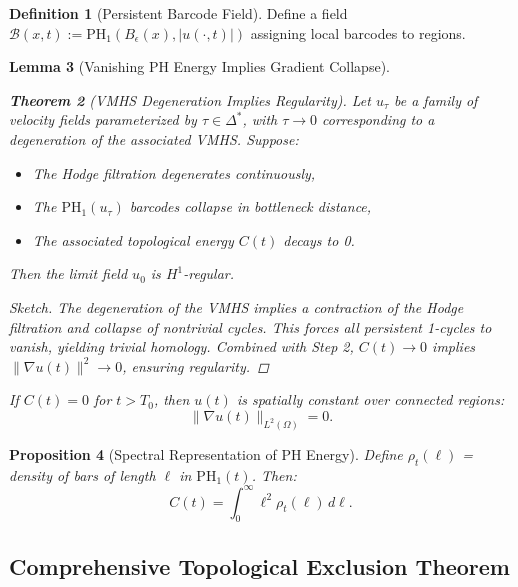 \documentclass[11pt]{article}
\newtheorem{theorem}{Theorem}[section]
\newtheorem{lemma}[theorem]{Lemma}
\newtheorem{proposition}[theorem]{Proposition}
\theoremstyle{definition}
\newtheorem{definition}[theorem]{Definition}
\begin{document}
\begin{definition}[Persistent Barcode Field]
Define a field $\mathcal{B}(x,t) := \mathrm{PH}_1(B_\epsilon(x), |u(\cdot,t)|)$ assigning local barcodes to regions.
\end{definition}

\begin{lemma}[Vanishing PH Energy Implies Gradient Collapse]

\begin{theorem}[VMHS Degeneration Implies Regularity]
Let $u_\tau$ be a family of velocity fields parameterized by $\tau \in \Delta^*$, with $\tau \to 0$ corresponding to a degeneration of the associated VMHS. Suppose:
\begin{itemize}
    \item The Hodge filtration degenerates continuously,
    \item The $\mathrm{PH}_1(u_\tau)$ barcodes collapse in bottleneck distance,
    \item The associated topological energy $C(t)$ decays to 0.
\end{itemize}
Then the limit field $u_0$ is $H^1$-regular.
\end{theorem}

\begin{proof}[Sketch]
The degeneration of the VMHS implies a contraction of the Hodge filtration and collapse of nontrivial cycles. This forces all persistent 1-cycles to vanish, yielding trivial homology. Combined with Step 2, $C(t) \to 0$ implies $\|\nabla u(t)\|^2 \to 0$, ensuring regularity.
\end{proof}
        If $C(t) = 0$ for $t > T_0$, then $u(t)$ is spatially constant over connected regions:
\[
\|\nabla u(t)\|_{L^2(\Omega)} = 0.
\]
\end{lemma}

\begin{proposition}[Spectral Representation of PH Energy]
Define $\rho_t(\ell)$ = density of bars of length $\ell$ in $\mathrm{PH}_1(t)$. Then:
\[
C(t) = \int_0^\infty \ell^2 \rho_t(\ell) \, d\ell.
\]
\end{proposition}

\subsection*{Comprehensive Topological Exclusion Theorem}
\end{document}
